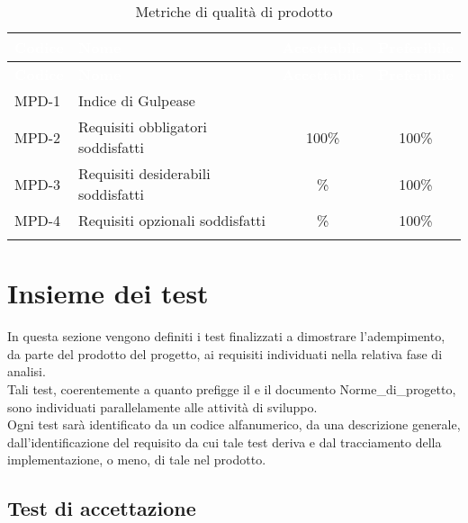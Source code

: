 {
\setlength{\tabcolsep}{10pt}
\renewcommand{\arraystretch}{1.5}
\begin{xltabular}{\textwidth}{| l | X | c | c |}
    \hline
     \textbf{\textcolor{white}{Codice}} & \textbf{\textcolor{white}{Nome}} & \textbf{\textcolor{white}{Accettabile}} & \textbf{\textcolor{white}{Preferibile}} \\
    \hline
    \endfirsthead
    \hline
     \textbf{\textcolor{white}{Codice}} & \textbf{\textcolor{white}{Nome}} & \textbf{\textcolor{white}{Accettabile}} & \textbf{\textcolor{white}{Preferibile}} \\ 
    \endhead
    MPD-1 & Indice di Gulpease &  &  \\
    \hline
    MPD-2 & Requisiti obbligatori soddisfatti & 100\% & 100\% \\
    \hline
    MPD-3 & Requisiti desiderabili soddisfatti & \% & 100\% \\
    \hline
    MPD-4 & Requisiti opzionali soddisfatti & \% & 100\% \\
    \hline
     \caption{Metriche di qualità di prodotto}
    \label{tab:mpd}
\end{xltabular}
}

\section{Insieme dei test} \label{sec:test}
In questa sezione vengono definiti i test finalizzati a dimostrare l'adempimento, da parte del prodotto del progetto, ai requisiti individuati nella relativa fase di analisi.\\
Tali test, coerentemente a quanto prefigge il  e il documento Norme\_di\_progetto, sono individuati parallelamente alle attività di sviluppo.\\
Ogni test sarà identificato da un codice alfanumerico, da una descrizione generale, dall'identificazione del requisito da cui tale test deriva e dal tracciamento della implementazione, o meno, di tale nel prodotto.

\subsection{Test di accettazione}

